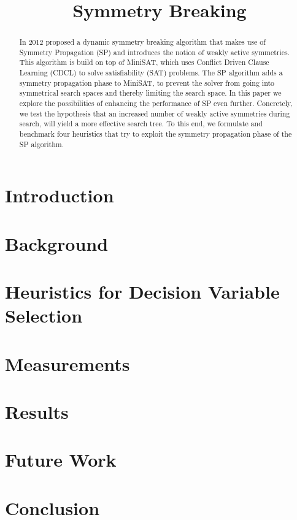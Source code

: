 

\title{Symmetry Breaking}


	\maketitle

	\begin{abstract}
	In 2012 \cite{devriendt2012symmetry} proposed a dynamic symmetry breaking algorithm that makes
	use of Symmetry Propagation (SP) and introduces the notion of weakly active symmetries. This
	algorithm is build on top of MiniSAT, which uses Conflict Driven Clause Learning (CDCL) to solve
	satisfiability (SAT) problems. The SP algorithm adds a symmetry propagation phase to MiniSAT, to
	prevent the solver from going into symmetrical search spaces and thereby limiting the search
	space. In this paper we explore the possibilities of enhancing the performance of SP even
	further.
	Concretely, we test the hypothesis that an increased number of weakly active symmetries during
	search, will yield a more effective search tree.
	To this end, we formulate and benchmark four heuristics that try to exploit the
	symmetry propagation phase of the SP algorithm.
	\end{abstract}

	\section{Introduction}
		\label{sec:Introduction}
		

	\section{Background}
		\label{sec:Background}
		

	\section{Heuristics for Decision Variable Selection}
		\label{sec:DecisionVars}
		

	\section{Measurements}
		\label{sec:measurements}
		

	\section{Results}
		\label{sec:Results}
		

		
		

	\section{Future Work}
		\label{sec:FutureWork}
		

	\section{Conclusion}
		\label{sec:Conclusion}
		

	\newpage
	
	

